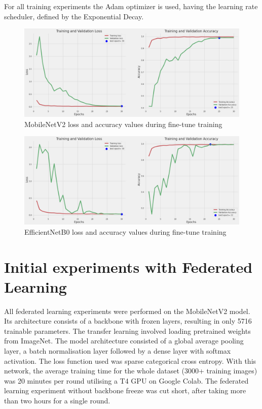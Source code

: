 \documentclass[runningheads,a4paper,11pt]{report}
\begin{document}
For all training experiments the Adam optimizer is used, having the learning rate scheduler, defined by the Exponential Decay. 

\begin{figure}[h]
    \centering
    \includegraphics[scale=0.25]{images/mobilenet.png} 
    \caption{MobileNetV2 loss and accuracy values during fine-tune training }
\end{figure}

\begin{figure}[h]
    \centering
    \includegraphics[scale=0.25]{images/efficientnet_plots.png} 
    \caption{EfficientNetB0 loss and accuracy values during fine-tune training }
\end{figure}


\section{Initial experiments with Federated Learning}
All federated learning experiments were performed on the MobileNetV2 model. Its architecture consists of a backbone with frozen layers, resulting in only 5716 trainable parameters. The transfer learning involved loading pretrained weights from ImageNet. The model architecture consisted of a global average pooling layer, a batch normalisation layer followed by a dense layer with softmax activation. The loss function used was sparse categorical cross entropy. With this network, the average training time for the whole dataset (3000+ training  images) was 20 minutes per round utilising a T4 GPU on Google Colab. The federated learning experiment without backbone freeze was cut short, after taking more than two hours for a single round.
\end{document}
